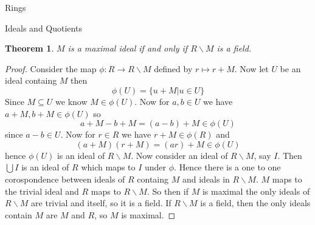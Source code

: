 \documentclass[11pt]{report}
\newcommand{\B }{\backslash}
\theoremstyle{break}
\newtheorem{thm}{Theorem}[section]
\begin{document}
\begin{chapter}{Rings}
\begin{section}{Ideals and Quotients}
    
    \begin{thm}
        $M$ is a maximal ideal if and only if $R\B M$ is a field. 
    \end{thm}

    
    \begin{proof}
        Consider the map $\phi: R \to R\B M$ defined by 
        $r \mapsto r+ M$. Now let $U$ be an ideal containg $M$ then 
        \[\phi(U) = \{u + M| u \in U\} \] 
         Since $M \subseteq U$ we know $M \in \phi(U)$. Now for $a, b \in U$ we have $a + M, b + M \in \phi(U)$ so 
         \[a + M - b + M = (a -b )+ M \in \phi(U)\]
         since $a-b \in U$. Now for $r \in R$ we have $r + M \in \phi(R)$ and 
         \[(a + M)(r + M) = (ar) + M \in \phi(U)\]
         hence $\phi(U)$ is an ideal of $R \B M$. 
         Now consider an ideal of $R \B M$, say $I$. Then $\bigcup I$ is an ideal of $R$ which maps to 
         $I$ under $\phi$. Hence there is a one to one corospondence between ideals of $R$ containg $M$ and 
         ideals in $R \B M$. $M$ maps to the trivial ideal and $R$ maps to $R \B M$. So then if $M$ is maximal 
         the only ideals of $R \B M$ are trivial and itself, so it is a field. If $R \B M$ is a field, then 
         the only ideals contain $M$ are $M$ and $R$, so $M$ is maximal. 

    \end{proof}

    
\end{section}
    
    \end{chapter}
    
\end{document}
